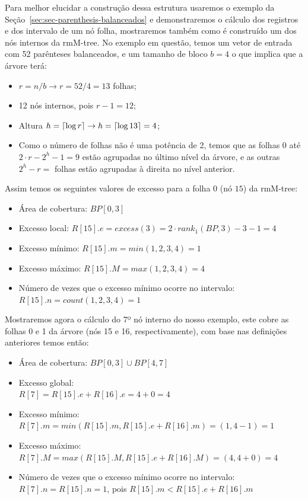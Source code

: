 \begin{example}\label{ex-build-tree}
    Para melhor elucidar a construção dessa estrutura usaremos o exemplo da Seção~\ref{sec:sec-parenthesis-balanceados} e demonstraremos o cálculo dos registros e dos intervalo de um nó folha, mostraremos também como é construído um dos nós internos da rmM-tree. No exemplo em questão, temos um vetor de entrada com 52 parênteses balanceados, e um tamanho de bloco $b = 4$ o que implica que a árvore terá:

    \begin{itemize}
        \item $r = n/b \to r = 52/4 = 13 $ folhas;
        \item 12 nós internos, pois $r-1 = 12$;
        \item Altura $h= \lceil\log r\rceil \to h = \lceil\log 13\rceil= 4$;
        \item Como o número de folhas não é uma potência de 2, temos que as folhas $0$ até $2 \cdot r - 2^h  -1 = 9$ estão agrupadas no último nível da árvore,  e as outras $2^h - r = $ folhas estão agrupadas à direita no nível anterior.
    \end{itemize}

    Assim temos os seguintes valores de excesso para a folha $0$ (nó $15$) da rmM-tree:
        \begin{itemize}
            \item  Área de cobertura:
            $ BP[0,3]$
            \item Excesso local:
            $R[15].e = excess(3) = 2 \cdot rank_1(BP,3) - 3 - 1= 4$
            \item Excesso mínimo:
            $R[15].m = min(1,2,3,4) = 1$
            \item Excesso máximo:
            $R[15].M = max(1,2,3,4) = 4$
            \item Número de vezes que o excesso mínimo ocorre no intervalo:\\
            $R[15].n = count(1,2,3,4) = 1$
        \end{itemize}
        
    Mostraremos agora o cálculo do 7º nó interno do nosso exemplo, este cobre as folhas 0 e 1 da árvore (nós 15 e 16, respectivamente), com base nas definições anteriores temos então:
    \begin{itemize}
        \item Área de cobertura: $BP[0,3] \cup BP[4,7]$
        \item Excesso global: \\
        $R[7] = R[15].e + R[16].e = 4 + 0 = 4$
        \item Excesso mínimo:\\
        $R[7].m = min(R[15].m, R[15].e+R[16].m) = (1,4-1)=1$
        \item Excesso máximo:\\
        $R[7].M = max(R[15].M, R[15].e+R[16].M) = (4,4+0)=4$
        \item Número de vezes que o excesso mínimo ocorre no intervalo:\\
        $R[7].n = R[15].n = 1$,  pois $R[15].m < R[15].e+R[16].m$
    \end{itemize}


\end{example}
